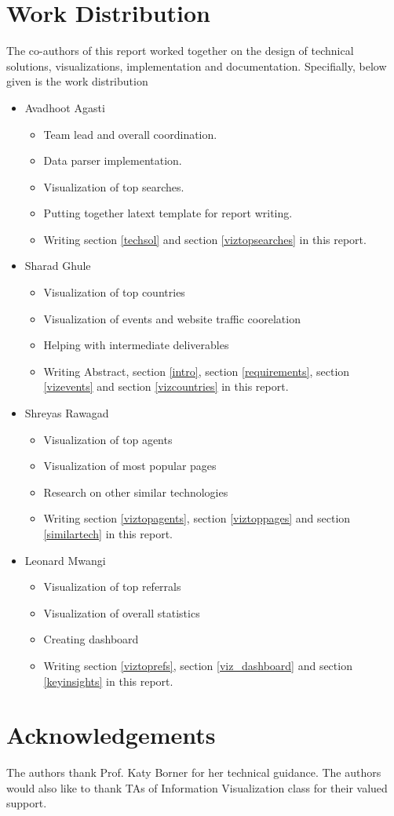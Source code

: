 \documentclass[sigconf]{acmart}
\begin{document}
\section{Work Distribution}
The co-authors of this report worked together on the design of technical
solutions, visualizations, implementation and documentation. Specifially,
below given is the work distribution
\begin{itemize}
\item Avadhoot Agasti
    \begin{itemize}
    \item Team lead and overall coordination.
    \item Data parser implementation.
    \item Visualization of top searches.
    \item Putting together latext template for report writing.
    \item Writing section \ref{techsol} and section \ref{viztopsearches}
     in this
    report.
    \end{itemize}

\item Sharad Ghule
    \begin{itemize}
    \item Visualization of top countries
    \item Visualization of events and website traffic coorelation
    \item Helping with intermediate deliverables
    \item Writing Abstract, section \ref{intro}, section \ref{requirements},
    section \ref{vizevents} and
    section \ref{vizcountries}  in this report.
    \end{itemize}

\item Shreyas Rawagad
    \begin{itemize}
    \item Visualization of top agents
    \item Visualization of most popular pages
    \item Research on other similar technologies
    \item Writing section \ref{viztopagents}, section \ref{viztoppages} and
    section \ref{similartech}  in this report.
    \end{itemize}

\item Leonard Mwangi
    \begin{itemize}
    \item Visualization of top referrals
    \item Visualization of overall statistics
    \item Creating dashboard
    \item Writing section \ref{viztoprefs}, section \ref{viz_dashboard} and
    section \ref{keyinsights} in this report.
    \end{itemize}

\end{itemize}


\section{Acknowledgements}
 The authors thank Prof. Katy Borner for her technical guidance. The
 authors would also like to thank TAs of Information Visualization class for their valued
 support.



 
\end{document}

